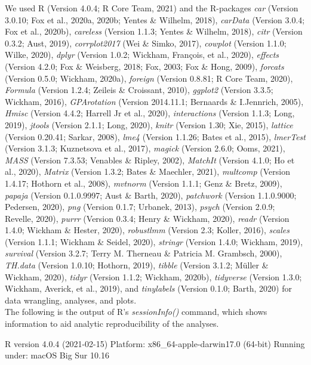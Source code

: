 \documentclass[
  english,
  man, noextraspace]{apa7}
\begin{document}
\begin{appendix}
We used R (Version 4.0.4; R Core Team, 2021) and the R-packages
\emph{car} (Version 3.0.10; Fox et al., 2020a, 2020b; Yentes \& Wilhelm,
2018), \emph{carData} (Version 3.0.4; Fox et al., 2020b),
\emph{careless} (Version 1.1.3; Yentes \& Wilhelm, 2018), \emph{citr}
(Version 0.3.2; Aust, 2019), \emph{corrplot2017} (Wei \& Simko, 2017),
\emph{cowplot} (Version 1.1.0; Wilke, 2020), \emph{dplyr} (Version
1.0.2; Wickham, François, et al., 2020), \emph{effects} (Version 4.2.0;
Fox \& Weisberg, 2018; Fox, 2003; Fox \& Hong, 2009), \emph{forcats}
(Version 0.5.0; Wickham, 2020a), \emph{foreign} (Version 0.8.81; R Core
Team, 2020), \emph{Formula} (Version 1.2.4; Zeileis \& Croissant, 2010),
\emph{ggplot2} (Version 3.3.5; Wickham, 2016), \emph{GPArotation}
(Version 2014.11.1; Bernaards \& I.Jennrich, 2005), \emph{Hmisc}
(Version 4.4.2; Harrell Jr et al., 2020), \emph{interactions} (Version
1.1.3; Long, 2019), \emph{jtools} (Version 2.1.1; Long, 2020),
\emph{knitr} (Version 1.30; Xie, 2015), \emph{lattice} (Version 0.20.41;
Sarkar, 2008), \emph{lme4} (Version 1.1.26; Bates et al., 2015),
\emph{lmerTest} (Version 3.1.3; Kuznetsova et al., 2017), \emph{magick}
(Version 2.6.0; Ooms, 2021), \emph{MASS} (Version 7.3.53; Venables \&
Ripley, 2002), \emph{MatchIt} (Version 4.1.0; Ho et al., 2020),
\emph{Matrix} (Version 1.3.2; Bates \& Maechler, 2021), \emph{multcomp}
(Version 1.4.17; Hothorn et al., 2008), \emph{mvtnorm} (Version 1.1.1;
Genz \& Bretz, 2009), \emph{papaja} (Version 0.1.0.9997; Aust \& Barth,
2020), \emph{patchwork} (Version 1.1.0.9000; Pedersen, 2020), \emph{png}
(Version 0.1.7; Urbanek, 2013), \emph{psych} (Version 2.0.9; Revelle,
2020), \emph{purrr} (Version 0.3.4; Henry \& Wickham, 2020),
\emph{readr} (Version 1.4.0; Wickham \& Hester, 2020), \emph{robustlmm}
(Version 2.3; Koller, 2016), \emph{scales} (Version 1.1.1; Wickham \&
Seidel, 2020), \emph{stringr} (Version 1.4.0; Wickham, 2019),
\emph{survival} (Version 3.2.7; Terry M. Therneau \& Patricia M.
Grambsch, 2000), \emph{TH.data} (Version 1.0.10; Hothorn, 2019),
\emph{tibble} (Version 3.1.2; Müller \& Wickham, 2020), \emph{tidyr}
(Version 1.1.2; Wickham, 2020b), \emph{tidyverse} (Version 1.3.0;
Wickham, Averick, et al., 2019), and \emph{tinylabels} (Version 0.1.0;
Barth, 2020) for data wrangling, analyses, and plots.\\
The following is the output of R's \emph{sessionInfo()} command, which
shows information to aid analytic reproducibility of the analyses.

R version 4.0.4 (2021-02-15) Platform: x86\_64-apple-darwin17.0 (64-bit)
Running under: macOS Big Sur 10.16


\end{appendix}
\end{document}
